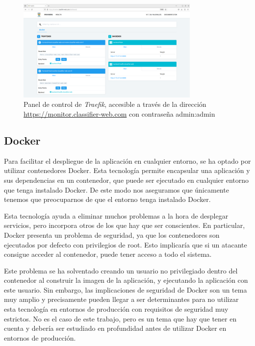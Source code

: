 \begin{figure}[htpb]
    \centering
    \includegraphics[width=0.8\textwidth]{cap3/images/monitor-dashboard.png}
    \caption{Panel de control de \textit{Traefik}, accesible a través de la dirección \url{https://monitor.classifier-web.com} con contraseña admin:admin}
    \label{fig:monitor-dashboard}
    
\end{figure}



\subsection{Docker}
Para facilitar el despliegue de la aplicación en cualquier entorno, se ha optado por utilizar contenedores Docker.
Esta tecnología permite encapsular una aplicación y sus dependencias en un contenedor, que puede ser ejecutado en cualquier entorno que tenga instalado Docker.
De este modo nos aseguramos que únicamente tenemos que preocuparnos de que el entorno tenga instalado Docker.

Esta tecnología ayuda a eliminar muchos problemas a la hora de desplegar servicios, pero incorpora otros de los que hay que ser conscientes.
En particular, Docker presenta un problema de seguridad, ya que los contenedores son ejecutados por defecto con privilegios de root.
Esto implicaría que si un atacante consigue acceder al contenedor, puede tener acceso a todo el sistema.

Este problema se ha solventado creando un usuario no privilegiado dentro del contenedor al construir la imagen de la aplicación, y ejecutando la aplicación con este usuario.
Sin embargo, las implicaciones de seguridad de Docker son un tema muy amplio y precisamente pueden llegar a ser determinantes para no utilizar esta tecnología en entornos de producción con requisitos de seguridad muy estrictos.
No es el caso de este trabajo, pero es un tema que hay que tener en cuenta y debería ser estudiado en profundidad antes de utilizar Docker en entornos de producción.

